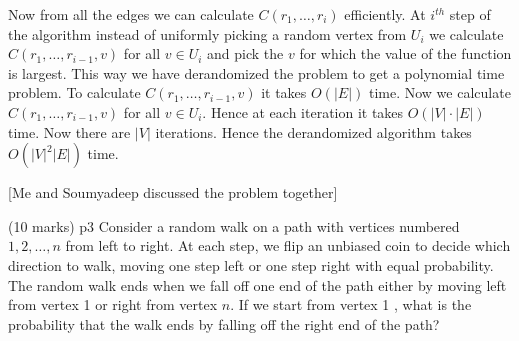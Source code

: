 \documentclass[a4paper, 11pt]{article}
\begin{document}
{Now from all the edges we can calculate $C(r_1,\dots, r_i)$ efficiently. At $i^{th}$ step of the algorithm instead of uniformly picking a random vertex from $U_i$ we calculate $C(r_1,\dots, r_{i-1}, v)$ for all $v\in U_i$ and pick the $v$ for which the value of the function is largest. This way we have derandomized the problem to get a polynomial time problem. To calculate $C(r_1,\dots, r_{i-1},v)$ it takes $O(|E|)$ time. Now we calculate $C(r_1,\dots, r_{i-1},v)$ for all $v\in U_i$. Hence at each iteration it takes $O(|V|\cdot |E|)$ time. Now there are $|V|$ iterations. Hence the derandomized algorithm takes $O(|V|^2|E|)$ time. 
}\parinf

[Me and Soumyadeep discussed the problem together]\parinn



\begin{problem}{%
		\hfill  (10 marks)
	}{p3%
	}
Consider a random walk on a path with vertices numbered $1,2, \ldots, n$ from left to right. At each step, we flip an unbiased coin to decide which direction to walk, moving one step left or one step right with equal probability. The random walk ends when we fall off one end of the path either by moving left from vertex 1 or right from vertex $n$. If we start from vertex 1 , what is the probability that the walk ends by falling off the right end of the path?
\end{problem}
\parinf
\end{document}

